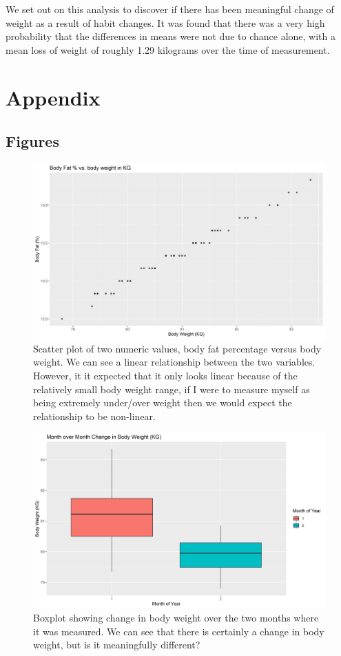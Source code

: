\documentclass[journal, a4paper]{IEEEtran}
\begin{document}
We set out on this analysis to discover if there has been meaningful change of weight as a result of habit changes. It was found that there was a very high 
probability that the differences in means were not due to chance alone, with a mean loss of weight of roughly 1.29 kilograms over the time of measurement. 

\newpage
\onecolumn

\section{Appendix}

\subsection{Figures}

\begin{figure}[h!]
	\includegraphics[width=\linewidth]{../plots/01_bf_vs_bw.png}
	\caption{Scatter plot of two numeric values, body fat percentage versus body weight. We can see a linear relationship between the two variables. However,
	it it expected that it only looks linear because of the relatively small body weight range, if I were to measure myself as being extremely under/over weight
	then we would expect the relationship to be non-linear.}
	\label{fig:1}
\end{figure}

\begin{figure}[h!]
	\includegraphics[width=\linewidth]{../plots/02_bw_vs_mnth.png}
	\caption{Boxplot showing change in body weight over the two months where it was measured. We can see that there is certainly a change in body weight, but is
	it meaningfully different?}
	\label{fig:2}
\end{figure}
\end{document}
